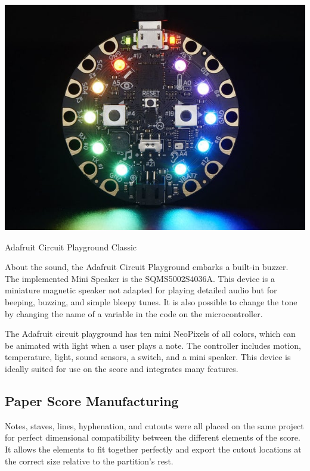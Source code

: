 \begin{marginfigure}
   \centering
   \includegraphics{images/circuit_playground_classic.jpg}
   \caption{Adafruit Circuit Playground Classic}
   \label{fig:circuit_playground_classic}
\end{marginfigure}

About the sound, the Adafruit Circuit Playground embarks a built-in buzzer. The implemented Mini Speaker is the SQMS5002S4036A. This device is a miniature magnetic speaker not adapted for playing detailed audio but for beeping, buzzing, and simple bleepy tunes. It is also possible to change the tone by changing the name of a variable in the code on the microcontroller.

The Adafruit circuit playground has ten mini NeoPixels of all colors, which can be animated with light when a user plays a note. The controller includes motion, temperature, light, sound sensors, a switch, and a mini speaker. This device is ideally suited for use on the score and integrates many features.

\subsection{Paper Score Manufacturing}

Notes, staves, lines, hyphenation, and cutouts were all placed on the same project for perfect dimensional compatibility between the different elements of the score. It allows the elements to fit together perfectly and export the cutout locations at the correct size relative to the partition's rest.

